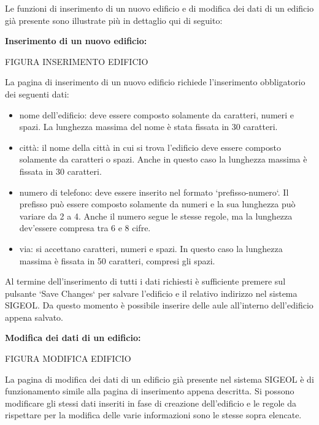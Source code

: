 \documentclass[11pt,a4paper]{article}
\begin{document}
Le funzioni di inserimento di un nuovo edificio e di modifica dei dati di un edificio già presente sono illustrate più in dettaglio qui di seguito:
\newline \newline
\begin{large}\textbf{Inserimento di un nuovo edificio:}\end{large}

\begin{LARGE}FIGURA INSERIMENTO EDIFICIO\end{LARGE}

La pagina di inserimento di un nuovo edificio richiede l'inserimento obbligatorio dei seguenti dati:
\begin{itemize}
 \item nome dell'edificio: deve essere composto solamente da caratteri, numeri e spazi. La lunghezza massima del nome è stata fissata in 30 caratteri.
 \item città: il nome della città in cui si trova l'edificio deve essere composto solamente da caratteri o spazi. Anche in questo caso la lunghezza massima è fissata in 30 caratteri.
 \item numero di telefono: deve essere inserito nel formato `prefisso-numero`. Il prefisso può essere composto solamente da numeri e la sua lunghezza può variare da 2 a 4. Anche il numero segue le stesse regole, ma la lunghezza dev'essere compresa tra 6 e 8 cifre.
 \item via: si accettano caratteri, numeri e spazi. In questo caso la lunghezza massima è fissata in 50 caratteri, compresi gli spazi.
\end{itemize}
Al termine dell'inserimento di tutti i dati richiesti è sufficiente premere sul pulsante `Save Changes` per salvare l'edificio e il relativo indirizzo nel sistema SIGEOL.
Da questo momento è possibile inserire delle aule all'interno dell'edificio appena salvato.
\newline \newline
\begin{large}\textbf{Modifica dei dati di un edificio:}\end{large}

\begin{LARGE}FIGURA MODIFICA EDIFICIO\end{LARGE}

La pagina di modifica dei dati di un edificio già presente nel sistema SIGEOL è di funzionamento simile alla pagina di inserimento appena descritta. Si possono modificare gli stessi dati inseriti in fase di creazione dell'edificio e le regole da rispettare per la modifica delle varie informazioni sono le stesse sopra elencate.
\end{document}
